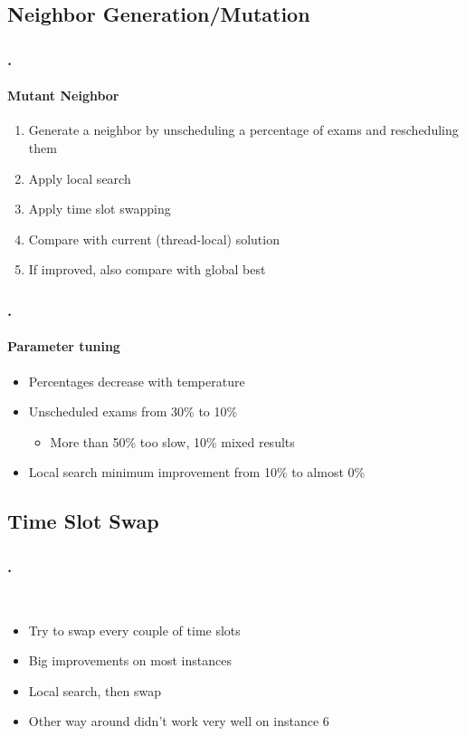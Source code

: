 \documentclass{beamer}
\begin{document}
\subsection{Neighbor Generation/Mutation}

\begin{frame}
\frametitle{\thesection.\thesubsection \ \insertsubsection}
\framesubtitle{Mutant Neighbor}
\begin{enumerate}
	\item Generate a neighbor by \alert{unscheduling a percentage of exams} and rescheduling them
	\item Apply local search
	\item Apply time slot swapping
	\item Compare with current (thread-local) solution
	\item If improved, also compare with global best
\end{enumerate}
\end{frame}

\begin{frame}
\frametitle{\thesection.\thesubsection \ \insertsubsection}
\framesubtitle{Parameter tuning}
\begin{itemize}
	\item Percentages decrease with temperature %
	\item Unscheduled exams from 30\% to 10\%
	\begin{itemize}
		\item More than 50\% too slow, 10\% mixed results %
	\end{itemize}
	\item Local search minimum improvement from 10\% to almost 0\%
\end{itemize}
\end{frame}

\subsection{Time Slot Swap}

\begin{frame}
\frametitle{\thesection.\thesubsection \ \insertsubsection}
\
\begin{itemize}
	\item Try to swap every couple of time slots %
	\item Big improvements on most instances
	\item Local search, then swap
	\item Other way around didn't work very well on instance 6
\end{itemize}
\end{frame}
\end{document}
